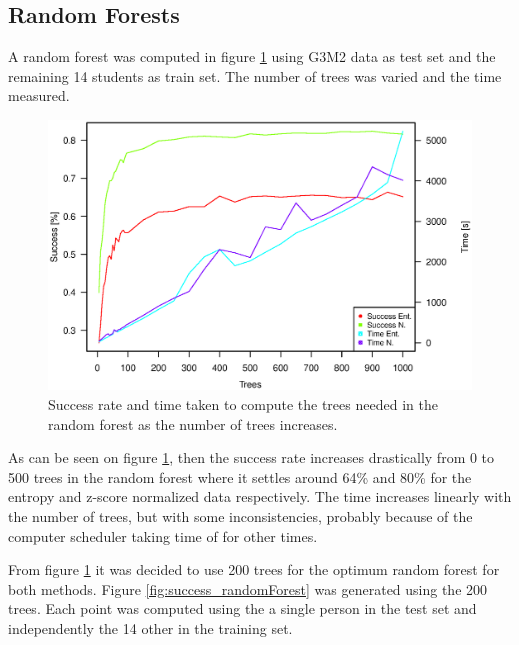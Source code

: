 \subsection{Random Forests}

A random forest was computed in figure \ref{fig:success_time_vs_trees_randomForest} using G3M2 data as test set and the remaining 14 students as train set.
The number of trees was varied and the time measured.

\begin{figure}[H]
\centering
\includegraphics[width = 0.95 \textwidth]{graphics/successRate_randomForest}
\caption{Success rate and time taken to compute the trees needed in the random forest as the number of trees increases.}
\label{fig:success_time_vs_trees_randomForest}
\end{figure}

As can be seen on figure \ref{fig:success_time_vs_trees_randomForest}, then the success rate increases drastically from 0 to 500 trees in the random forest where it settles around 64\% and 80\% for the entropy and z-score normalized data respectively.
The time increases linearly with the number of trees, but with some inconsistencies, probably because of the computer scheduler taking time of for other times.

From figure \ref{fig:success_time_vs_trees_randomForest} it was decided to use 200 trees for the optimum random forest for both methods.
Figure \ref{fig:success_randomForest} was generated using the 200 trees.
Each point was computed using the a single person in the test set and independently the 14 other in the training set.

